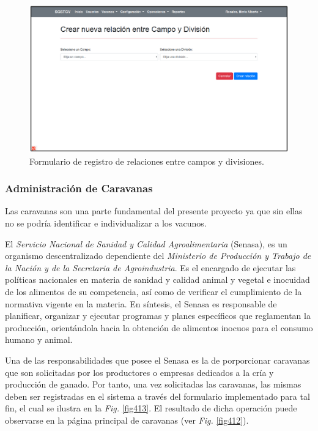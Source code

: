 \documentclass[11pt,oneside]{book}
\begin{document}
\begin{figure}[tbhp]
\centerline{\includegraphics[scale=0.87]{figs/capitulo_3_desarrollo/fig411.pdf}}
\caption{Formulario de registro de relaciones entre campos y divisiones.}
\label{fig411}
\end{figure}

\newpage
\subsubsection{Administración de Caravanas}
Las caravanas son una parte fundamental del presente proyecto ya que sin ellas no se podría identificar e individualizar a los vacunos.

El \textit{Servicio Nacional de Sanidad y Calidad Agroalimentaria} (Senasa), es un organismo descentralizado dependiente del \textit{Ministerio de Producción y Trabajo de la Nación y de la Secretaria de Agroindustria}. Es el encargado de ejecutar las políticas nacionales en materia de sanidad y calidad animal y vegetal e inocuidad de los alimentos de su competencia, así como de verificar el cumplimiento de la normativa vigente en la materia. En síntesis, el Senasa es responsable de planificar, organizar y ejecutar programas y planes específicos que reglamentan la producción, orientándola hacia la obtención de alimentos inocuos para el consumo humano y animal.

Una de las responsabilidades que posee el Senasa es la de porporcionar caravanas que son solicitadas por los productores o empresas dedicados a la cría y producción de ganado. Por tanto, una vez solicitadas las caravanas, las mismas deben ser registradas en el sistema a través del formulario implementado para tal fin, el cual se ilustra en la \textit{Fig.} \eqref{fig413}. El resultado de dicha operación puede observarse en la página principal de caravanas (ver \textit{Fig.} \eqref{fig412}).
\end{document}
